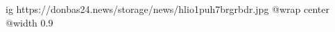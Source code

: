  
 
 
 
 

\ifcmt
  ig https://donbas24.news/storage/news/hlio1puh7brgrbdr.jpg
  @wrap center
  @width 0.9
\fi
